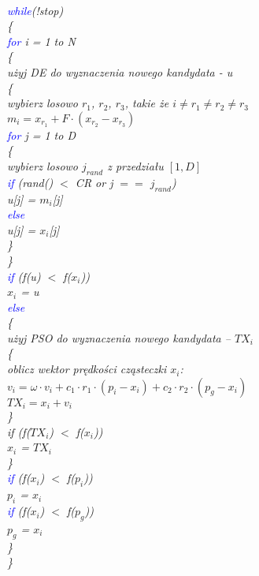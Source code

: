 \documentclass{article}
\begin{document}
\textit{
\\
\textcolor{blue}{while}(!stop)\\
\{\\
\indent	\textcolor{blue}{for} i = 1 to N\\
\indent	\{\\
\indent\indent użyj DE do wyznaczenia nowego kandydata - u\\
\indent\indent \{\\
\indent\indent		wybierz losowo $r_1$, $r_2$, $r_3$, takie że  $i \neq r_1 \neq r_2 \neq r_3$\\
\indent\indent\indent 		$m_i = x_{r_1} + F \cdot  (x_{r_2} - x_{r_3})$\\
\indent\indent\indent		\textcolor{blue}{for} j = 1 to D\\
\indent\indent\indent		\{\\
\indent\indent\indent\indent			wybierz losowo $j_{rand}$ z przedziału $[1, D]$\\
\indent\indent\indent\indent			\textcolor{blue}{if} (rand() $<$ CR or j $==$ $j_{rand}$)\\
\indent\indent\indent\indent\indent				u[j] = $m_i$[j]\\
\indent\indent\indent\indent			\textcolor{blue}{else}\\
\indent\indent\indent\indent\indent				u[j] = $x_i$[j]\\
\indent\indent\indent		\}\\
\indent\indent \}\\
\indent\indent		\textcolor{blue}{if} (f(u) $<$ f($x_i$))\\
\indent\indent\indent			$x_i$ = u\\
\indent\indent		\textcolor{blue}{else}\\
\indent\indent		\{\\
\indent\indent\indent			użyj PSO do wyznaczenia nowego kandydata – $TX_i$\\
\indent\indent\indent			\{\\
\indent\indent\indent\indent				oblicz wektor prędkości cząsteczki $x_i$:\\
\indent\indent\indent\indent				$v_i = \omega \cdot v_i + c_1 \cdot r_1 \cdot (p_i - x_i) + c_2 \cdot r_2 \cdot (p_g - x_i)$\\
\indent\indent\indent\indent				$TX_i = x_i + v_i$\\
\indent\indent\indent			\}\\
\indent\indent\indent			if (f($TX_i$) $<$ f($x_i$))\\
\indent\indent\indent\indent				$x_i$ = $TX_i$\\
\indent\indent	\}\\
\indent\indent		\textcolor{blue}{if} (f($x_i$) $<$ f($p_i$))\\
\indent\indent\indent			$p_i$ = $x_i$\\
\indent\indent		\textcolor{blue}{if} (f($x_i$) $<$ f($p_g$))\\
\indent\indent\indent			$p_g$ = $x_i$\\
\indent	\}\\
\}
}
\end{document}
